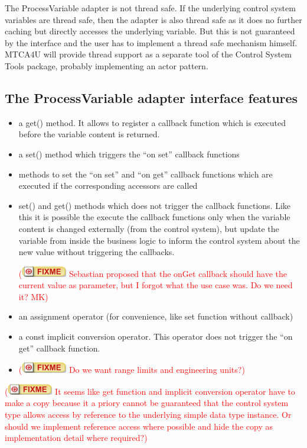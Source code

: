 \documentclass[11pt,a4paper]{scrartcl}
\newcounter{nFixmes}
\newcommand{\fixme}[1]{\addtocounter{nFixmes}{1}\textcolor{red}{(\includegraphics[height=2ex]{fixme} #1)}\xspace}
\begin{document}
The ProcessVariable adapter is not thread safe. If the underlying control
system variables are thread safe, then the adapter is also thread safe as it
does no further caching but directly accesses the underlying variable. But this
is not guaranteed by the interface and the user has to implement a thread safe
mechanism himself. MTCA4U will provide thread support as a separate tool of
the Control System Tools package, probably implementing an actor pattern.

\subsection{The ProcessVariable adapter interface features}
\begin{itemize}
\item a get() method. It allows to register a callback function which is executed before
  the variable content is returned.
\item a set() method which triggers the ``on set'' callback functions
\item methods to set the ``on set'' and ``on get'' callback functions which are executed 
  if the corresponding accessors are called
\item set() and get() methods which does not trigger the callback functions. Like this
  it is possible the execute the callback functions only when the variable
  content is changed externally (from the control system), but update the
  variable from inside the business logic to inform the control system about
  the new value without triggering the callbacks. 
  \fixme{Sebastian proposed that the onGet callback should have the current value as parameter, 
    but I forgot what the use case was. Do we need it? MK}
\item an assignment operator (for convenience, like set function without
  callback)
\item a const implicit conversion operator. This operator does not trigger the ``on get'' callback
  function.
\item \fixme{Do we want range limits and engineering units?}
\end{itemize}
\fixme{It seems like get function and implicit conversion operator have to make a copy
  because it a priory cannot be guaranteed that the control system type allows
  access by reference to the underlying simple data type instance. Or should we implement 
  reference access where possible and hide the copy as implementation detail where required?}
\end{document}
